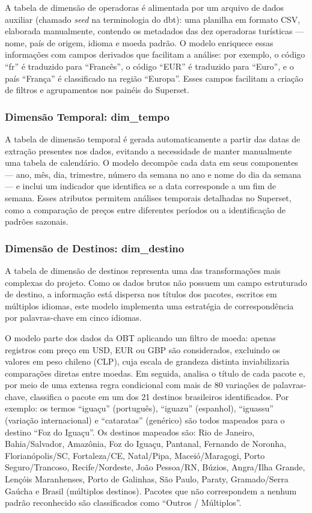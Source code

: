 A tabela de dimensão de operadoras é alimentada por um arquivo de dados auxiliar
(chamado \textit{seed} na terminologia do dbt): uma planilha em formato CSV, elaborada
manualmente, contendo os metadados das dez operadoras turísticas — nome, país de
origem, idioma e moeda padrão. O modelo enriquece essas informações com campos
derivados que facilitam a análise: por exemplo, o código ``fr'' é traduzido para
``Francês'', o código ``EUR'' é traduzido para ``Euro'', e o país ``França'' é
classificado na região ``Europa''. Esses campos facilitam a criação de filtros e
agrupamentos nos painéis do Superset.

\subsubsection{Dimensão Temporal: dim\_tempo}

A tabela de dimensão temporal é gerada automaticamente a partir das datas de extração
presentes nos dados, evitando a necessidade de manter manualmente uma tabela de
calendário. O modelo decompõe cada data em seus componentes — ano, mês, dia, trimestre,
número da semana no ano e nome do dia da semana — e inclui um indicador que identifica
se a data corresponde a um fim de semana. Esses atributos permitem análises temporais
detalhadas no Superset, como a comparação de preços entre diferentes períodos ou a
identificação de padrões sazonais.

\subsubsection{Dimensão de Destinos: dim\_destino}

A tabela de dimensão de destinos representa uma das transformações mais complexas do
projeto. Como os dados brutos não possuem um campo estruturado de destino, a
informação está dispersa nos títulos dos pacotes, escritos em múltiplos idiomas,
este modelo implementa uma estratégia de correspondência por palavras-chave em cinco
idiomas.

O modelo parte dos dados da OBT aplicando um filtro de moeda: apenas registros com
preço em USD, EUR ou GBP são considerados, excluindo os valores em peso chileno (CLP),
cuja escala de grandeza distinta inviabilizaria comparações diretas entre moedas. Em
seguida, analisa o título de cada pacote e, por meio de uma extensa regra condicional
com mais de 80 variações de palavras-chave, classifica o pacote em um dos 21 destinos
brasileiros identificados. Por exemplo: os termos ``iguaçu'' (português), ``iguazu''
(espanhol), ``iguassu'' (variação internacional) e ``cataratas'' (genérico) são todos
mapeados para o destino ``Foz do Iguaçu''. Os destinos mapeados são: Rio de Janeiro,
Bahia/Salvador, Amazônia, Foz do Iguaçu, Pantanal, Fernando de Noronha,
Florianópolis/SC, Fortaleza/CE, Natal/Pipa, Maceió/Maragogi, Porto Seguro/Trancoso,
Recife/Nordeste, João Pessoa/RN, Búzios, Angra/Ilha Grande, Lençóis Maranhenses, Porto
de Galinhas, São Paulo, Paraty, Gramado/Serra Gaúcha e Brasil (múltiplos destinos).
Pacotes que não correspondem a nenhum padrão reconhecido são classificados como
``Outros / Múltiplos''.

